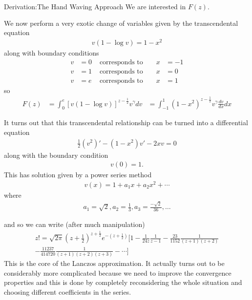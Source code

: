 \documentclass[pdf]{beamer}
\begin{document}
\begin{frame}{Derivation:The Hand Waving Approach}
    We are interested in $ F(z) $.

    We now perform a very exotic change of variables given by the transcendental equation
    \begin{align*}
        v(1-\log v) = 1 - x^2
    \end{align*}
    along with boundary conditions
    \begin{align*}
        v &= 0 &\text{ corresponds to } && x &= -1 \\
        v &= 1 &\text{ corresponds to } && x &= 0 \\
        v &= e &\text{ corresponds to } && x &= 1
    \end{align*}
    so
    \begin{align*}
        F(z) &= \int_0^e \left[ v(1 - \log v )\right]^{z - \frac{1}{2}} v^\gamma dv
             &= \int_{-1}^1 (1-x^2)^{z-\frac{1}{2}} v^\gamma \frac{dv}{dx} dx
    \end{align*}
\end{frame}
\begin{frame}
It turns out that this transcendental relationship can be turned into a differential equation
\begin{align*}
    \frac{1}{2}(v^2)' - (1-x^2)v' -2xv = 0
\end{align*}
along with the boundary condition
\begin{align*}
    v(0) = 1.
\end{align*}
This has solution given by a power series method
\begin{align*}
    v(x) = 1 + a_1x + a_2x^2 + \cdots
\end{align*}
where 
\begin{align*}
    a_1 = \sqrt{2}, a_2 = \frac{1}{3}, a_3 = \frac{-\sqrt{2}}{36}, \ldots
\end{align*}
\end{frame}
\begin{frame}
and so we can write (after much manipulation)
\begin{align*}  
    z! = \sqrt{2\pi} (z + \frac{1}{2})^{z+\frac{1}{2}} e^{-(z+\frac{1}{2})} \Big[ 1 - \frac{1}{24z}\frac{1}{z-1} - \frac{23}{1152}\frac{1}{(z+1)(z+2)} \\ - \frac{11237}{414720} \frac{1}{(z+1)(z+2)(z+3)} - \cdots \Big]
\end{align*}
This is the core of the Lanczos approximation. It actually turns out to be considerably more complicated because we need to improve the convergence properties and this is done by completely reconsidering the whole situation and choosing different coefficients in the series.
\end{frame}
\end{document}
